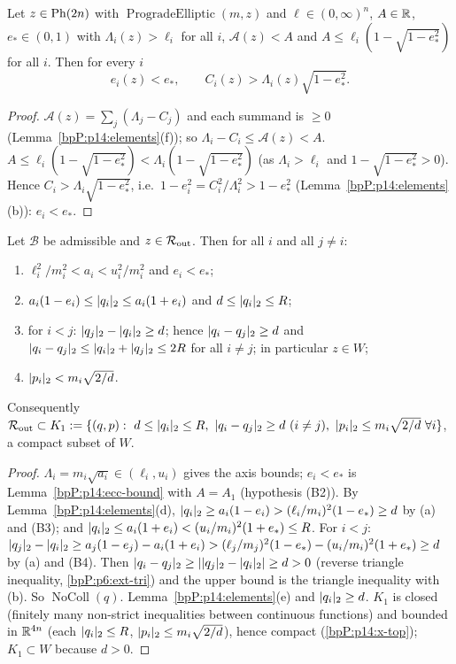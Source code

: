 \begin{lemma}\label{bpP:p14:ecc-bound}
Let $z\in\mathrm{Ph}(2n)$ with $\operatorname{ProgradeElliptic}(m,z)$ and $\ell\in(0,\infty)^n$, $A\in\mathbb{R}$, $e_*\in(0,1)$ with $\Lambda_i(z)>\ell_i$ for all $i$, $\mathcal A(z)<A$ and $A\le\ell_i(1-\sqrt{1-e_*^2})$ for all $i$. Then for every $i$
\[e_i(z)<e_*,\qquad C_i(z)>\Lambda_i(z)\sqrt{1-e_*^2}.\]
\end{lemma}
\begin{proof}
\label{stepP:p14:eb-sum} $\mathcal A(z)=\sum_j(\Lambda_j-C_j)$ and each summand is $\ge0$ (Lemma~\ref{bpP:p14:elements}(f)); so $\Lambda_i-C_i\le\mathcal A(z)<A$.
\label{stepP:p14:eb-ecc} $A\le\ell_i(1-\sqrt{1-e_*^2})<\Lambda_i(1-\sqrt{1-e_*^2})$ (as $\Lambda_i>\ell_i$ and $1-\sqrt{1-e_*^2}>0$). Hence $C_i>\Lambda_i\sqrt{1-e_*^2}$, i.e.\ $1-e_i^2=C_i^2/\Lambda_i^2>1-e_*^2$ (Lemma~\ref{bpP:p14:elements}(b)): $e_i<e_*$.
\end{proof}

\begin{lemma}\label{bpP:p14:geometry}
Let $\mathcal B$ be admissible and $z\in\mathcal R_{\rm out}$. Then for all $i$ and all $j\ne i$:
\begin{enumerate}[label=(\alph*)]
\item $\ell_i^2/m_i^2<a_i<u_i^2/m_i^2$ and $e_i<e_*$;
\item $a_i(1-e_i)\le\lvert q_i\rvert_2\le a_i(1+e_i)$ and $d\le\lvert q_i\rvert_2\le R$;
\item for $i<j$: $\lvert q_j\rvert_2-\lvert q_i\rvert_2\ge d$; hence $\lvert q_i-q_j\rvert_2\ge d$ and $\lvert q_i-q_j\rvert_2\le\lvert q_i\rvert_2+\lvert q_j\rvert_2\le2R$ for all $i\ne j$; in particular $z\in W$;
\item $\lvert p_i\rvert_2<m_i\sqrt{2/d}$.
\end{enumerate}
Consequently $\mathcal R_{\rm out}\subset K_1:=\{(q,p):\ d\le\pl{q_i}\le R,\ \pl{q_i-q_j}\ge d\ (i\neq j),\ \pl{p_i}\le m_i\sqrt{2/d}\ \forall i\}$, a compact subset of $W$.
\end{lemma}
\begin{proof}
\label{stepP:p14:geo-a} $\Lambda_i=m_i\sqrt{a_i}\in(\ell_i,u_i)$ gives the axis bounds; $e_i<e_*$ is Lemma~\ref{bpP:p14:ecc-bound} with $A=A_1$ (hypothesis (B2)).
\label{stepP:p14:geo-b} By Lemma~\ref{bpP:p14:elements}(d), $\lvert q_i\rvert_2\ge a_i(1-e_i)>(\ell_i/m_i)^2(1-e_*)\ge d$ by (a) and (B3); and $\lvert q_i\rvert_2\le a_i(1+e_i)<(u_i/m_i)^2(1+e_*)\le R$.
\label{stepP:p14:geo-c} For $i<j$: $\lvert q_j\rvert_2-\lvert q_i\rvert_2\ge a_j(1-e_j)-a_i(1+e_i)>(\ell_j/m_j)^2(1-e_*)-(u_i/m_i)^2(1+e_*)\ge d$ by (a) and (B4). Then $\lvert q_i-q_j\rvert_2\ge\lvert \lvert q_j\rvert_2-\lvert q_i\rvert_2\rvert\ge d>0$ (reverse triangle inequality, \ref{bpP:p6:ext-tri}) and the upper bound is the triangle inequality with (b). So $\operatorname{NoColl}(q)$.
\label{stepP:p14:geo-d} Lemma~\ref{bpP:p14:elements}(e) and $\lvert q_i\rvert_2\ge d$.
\label{stepP:p14:geo-k} $K_1$ is closed (finitely many non-strict inequalities between continuous functions) and bounded in $\mathbb{R}^{4n}$ (each $\lvert q_i\rvert_2\le R$, $\lvert p_i\rvert_2\le m_i\sqrt{2/d}$), hence compact (\ref{bpP:p14:x-top}); $K_1\subset W$ because $d>0$.
\end{proof}

